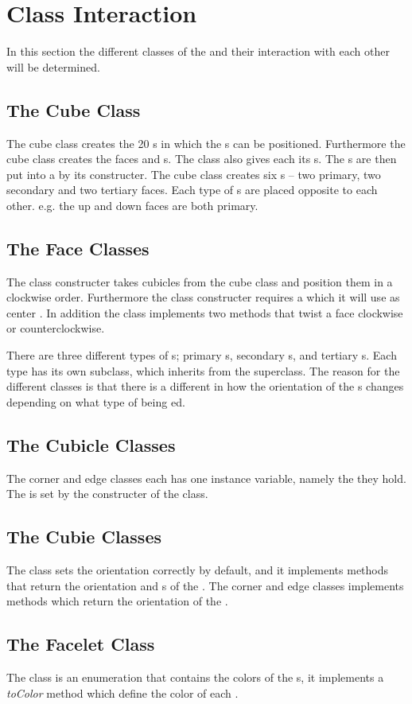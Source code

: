 \section{Class Interaction}
In this section the different classes of the \rubik{} and their interaction with each other will be determined.
\subsection{The Cube Class}
The cube class creates the 20 \cubicle{}s in which the \cpiece{}s can be positioned. Furthermore the cube class creates the faces and \cubie{}s. The class also gives each \cpiece{} its \facelet{}s. The \cubie{}s are then put into a \face{} by its constructer. The cube class creates six \face{}s -- two primary, two secondary and two tertiary faces. Each type of \face{}s are placed opposite to each other. e.g. the up and down faces are both primary.

\subsection{The Face Classes}
The \face{} class constructer takes cubicles from the cube class and position them in a clockwise order. Furthermore the \face{} class constructer requires a \facelet{} which it will use as center \facelet{}. In addition the \face{} class implements two methods that twist a face clockwise or counterclockwise.

There are three different types of \face{}s; primary \face{}s, secondary \face{}s, and tertiary \face{}s.
Each type has its own subclass, which inherits from the \face{} superclass.
The reason for the different classes is that there is a different in how the orientation of the \cubie{}s changes depending on what type of \face{} being \twist{}ed.

\subsection{The Cubicle Classes}
The corner and edge \cubicle{} classes each has one instance variable, namely the \cubie{} they hold. The \cpiece{} is set by the constructer of the \cubicle{} class.

\subsection{The Cubie Classes}
The \cpiece{} class sets the orientation correctly by default, and it implements methods that return the orientation and \facelet{}s of the \cpiece{}. The corner and edge \cpiece{} classes implements methods which return the orientation of the \cpiece{}.

\subsection{The Facelet Class}
The \facelet{} class is an enumeration that contains the colors of the \facelet{}s, it implements a \textit{toColor} method which define the color of each \facelet{}.
\myTail{}